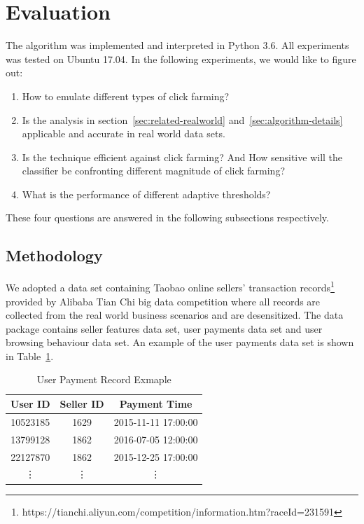 \documentclass[10pt,conference,letterpaper]{IEEEtran}
\begin{document}
	\section{Evaluation}\label{sec:evaluation}
		The algorithm was implemented and interpreted in Python 3.6. All experiments was tested on Ubuntu 17.04. In the following experiments, we would like to figure out:
	
		\begin{enumerate}
			\item How to emulate different types of click farming?
			\item Is the analysis in section~\ref{sec:related-realworld} and~\ref{sec:algorithm-details} applicable and accurate in real world data sets.
			\item Is the technique efficient against click farming? And How sensitive will the classifier be confronting different magnitude of click farming?
			\item What is the performance of different adaptive thresholds?
		\end{enumerate}
	
		These four questions are answered in the following subsections respectively.
	
		\subsection{Methodology}\label{sec:exp-methodology}
			We adopted a data set containing Taobao online sellers' transaction records\footnote{https://tianchi.aliyun.com/competition/information.htm?raceId=231591} provided by Alibaba Tian Chi big data competition where all records are collected from the real world business scenarios and are desensitized. The data package contains seller features data set, user payments data set and user browsing behaviour data set. An example of the user payments data set is shown in Table~\ref{tab:user-payment-sample}.
	
			\begin{table}[!ht]
				\centering
				\caption{User Payment Record Exmaple}
				\label{tab:user-payment-sample}
				\begin{tabular}{|c|c|c|}
					\hline
					User ID & Seller ID & Payment Time\\
					\hline
					10523185 & 1629 & 2015-11-11 17:00:00\\
					\hline
					13799128 & 1862 & 2016-07-05 12:00:00\\
					\hline
					22127870 & 1862 & 2015-12-25 17:00:00\\
					\hline
					\vdots & \vdots & \vdots\\
					\hline
				\end{tabular}
			\end{table}
	
\end{document}
